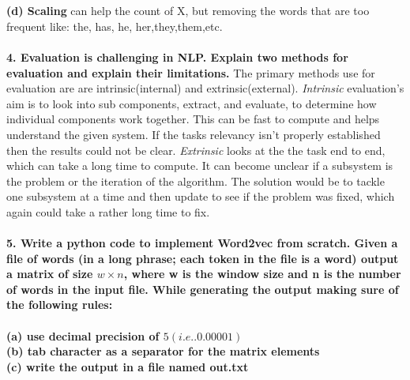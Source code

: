 \documentclass[12pt,a4paper]{report}
\begin{document}
\\\\
\textbf{(d) Scaling} can help the count of X, but removing the words that are too frequent like: the, has, he, her,they,them,etc. 
\\\\
\textbf{4. Evaluation is challenging in NLP. Explain two methods for evaluation and explain their limitations.} The primary methods use for evaluation are are intrinsic(internal) and extrinsic(external). \emph{Intrinsic }evaluation's aim is to look into sub components, extract, and evaluate, to determine how individual components work together. This can be fast to compute and helps understand the given system. If the tasks relevancy isn't properly established then the results could not be clear. \emph{Extrinsic}  looks at the the task end to end, which can take a long time to compute. It can become unclear if a subsystem is the problem or the iteration of the algorithm. The solution would be to tackle one subsystem at a time and then update to see if the problem was fixed, which again could take a rather long time to fix. 
\\\\ 
\textbf{5. Write a python code to implement Word2vec from scratch. Given a file of words (in a long phrase; each token in the file is a word) output a matrix of size $w \times n$, where w is the window size and n is the number of words in the input file. While generating the output making sure of the following rules:}
\\\\
\textbf{(a) use decimal precision of $5 (i.e.. 0.00001)$}\\
\textbf{(b) tab character as a separator for the matrix elements}\\
\textbf{(c) write the output in a file named out.txt}\\
\end{document}
